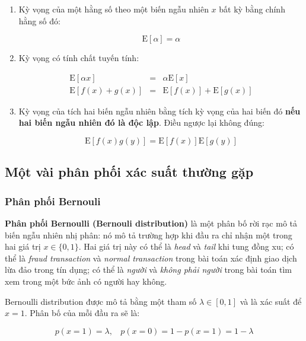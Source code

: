 \documentclass[../main-report.tex]{subfiles}
\begin{document}
\begin{enumerate}
\item Kỳ vọng của một hằng số theo một biến ngẫu nhiên \(x\) bất kỳ bằng chính hằng số đó:

\begin{equation}
\text{E}[\alpha] = \alpha
\end{equation}

\item Kỳ vọng có tính chất tuyến tính:

\begin{eqnarray}
  \text{E}[\alpha x] & = & \alpha \text{E}[x] \quad \\
  \text{E}[f(x) + g(x)] & = & \text{E}[f(x)] + \text{E}[g(x)]
\end{eqnarray}

\item Kỳ vọng của tích hai biến ngẫu nhiên bằng tích kỳ vọng của hai biến đó \textbf{nếu hai biến ngẫu nhiên đó là độc lập}. Điều ngược lại không đúng:

\begin{equation}
\text{E}[f(x) g(y)] = \text{E}[f(x)] \text{E}[g(y)]
\end{equation}

\end{enumerate}
\subsection{Một vài phân phối xác suất thường gặp}
\subsubsection*{Phân phối Bernouli}
\textbf{Phân phối Bernoulli (Bernouli distribution)} là một phân bố rời rạc mô tả biến ngẫu nhiên nhị phân: nó mô tả trường hợp khi đầu ra chỉ nhận một trong hai giá trị \(x \in \{0, 1\}\). Hai giá trị này có thể là \emph{head} và \emph{tail} khi tung đồng xu; có thể là \emph{fraud transaction} và \emph{normal transaction} trong bài toán xác định giao dịch lừa đảo trong tín dụng; có thể là \emph{người} và \emph{không phải người} trong bài toán tìm xem trong một bức ảnh có người hay không.

Bernoulli distribution được mô tả bằng một tham số \(\lambda \in [0, 1]\) và là xác suất để \(x = 1\). Phân bố của mỗi đầu ra sẽ là:

\begin{equation}
p(x = 1) = \lambda, ~~~~ p(x = 0) = 1 - p(x = 1) = 1 - \lambda
\end{equation}
\end{document}
